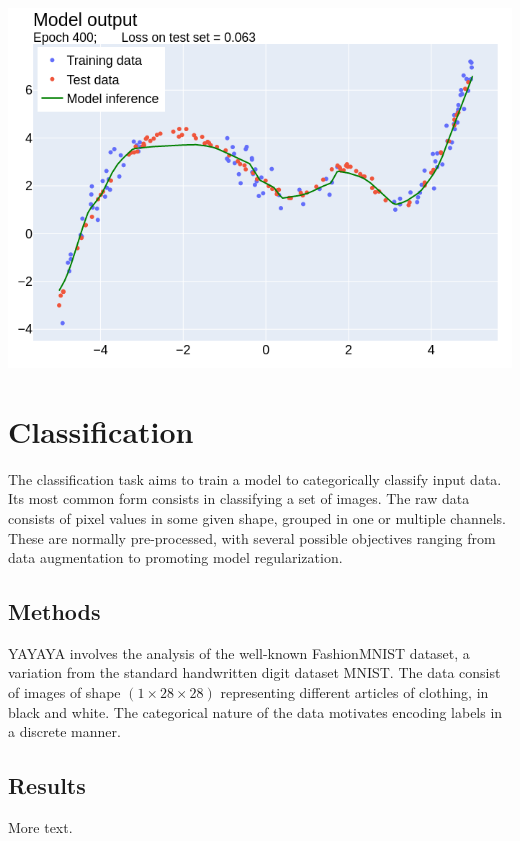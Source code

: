 \documentclass[11pt]{article} %
\newenvironment{Figure}{\par\medskip\noindent\minipage{\linewidth}}{\endminipage\par\medskip}
\begin{document}
\begin{multicols}{2}
\begin{Figure}
	\includegraphics[width=\linewidth]{res/newplot.png}
\end{Figure}

\section{Classification}
The classification task aims to train a model to categorically classify input data. Its most common form consists in classifying a set of images. The raw data consists of pixel values in some given shape, grouped in one or multiple channels. These are normally pre-processed, with several possible objectives ranging from data augmentation to promoting model regularization.

\subsection{Methods}
YAYAYA
involves the analysis of the well-known FashionMNIST dataset, a variation from the standard handwritten digit dataset MNIST. The data consist of images of shape $(1 \times 28 \times 28)$ representing different articles of clothing, in black and white. The categorical nature of the data motivates encoding labels in a discrete manner.\\
\subsection{Results}

More text.

\end{multicols}
\end{document}

